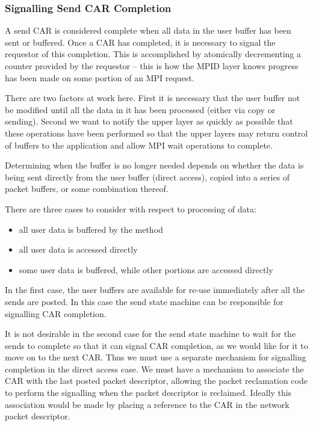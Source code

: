 \documentclass[11pt,letterpaper]{article}
\begin{document}
\subsubsection{Signalling Send CAR Completion}

A send CAR is considered complete when all data in the user buffer has been
sent or buffered.  Once a CAR has completed, it is necessary to signal the
requestor of this completion.  This is accomplished by atomically decrementing
a counter provided by the requestor -- this is how the MPID layer knows
progress has been made on some portion of an MPI request.

There are two factors at work here.  First it is necessary that the user
buffer not be modified until all the data in it has been processed (either via
copy or sending).  Second we want to notify the upper layer as quickly as
possible that these operations have been performed so that the upper layers may
return control of buffers to the application and allow MPI wait operations to
complete.

Determining when the buffer is no longer needed depends on
whether the data is being sent directly from the user buffer (direct access),
copied into a series of packet buffers, or some combination thereof.

There are three cases to consider with respect to processing of data:
\begin{itemize}
\item all user data is buffered by the method
\item all user data is accessed directly
\item some user data is buffered, while other portions are accessed directly
\end{itemize}

In the first case, the user buffers are available for re-use immediately after
all the sends are posted.  In this case the send state machine can be
responsible for signalling CAR completion.

It is not desirable in the second case for the send state machine to wait for
the sends to complete so that it can signal CAR completion, as we would like
for it to move on to the next CAR.  Thus we must use a separate mechanism for
signalling completion in the direct access case.  We must have a mechanism to
associate the CAR with the last posted packet descriptor, allowing the packet
reclamation code to perform the signalling when the packet descriptor is
reclaimed.  Ideally this association would be made by placing a reference to
the CAR in the network packet descriptor.
\end{document}
